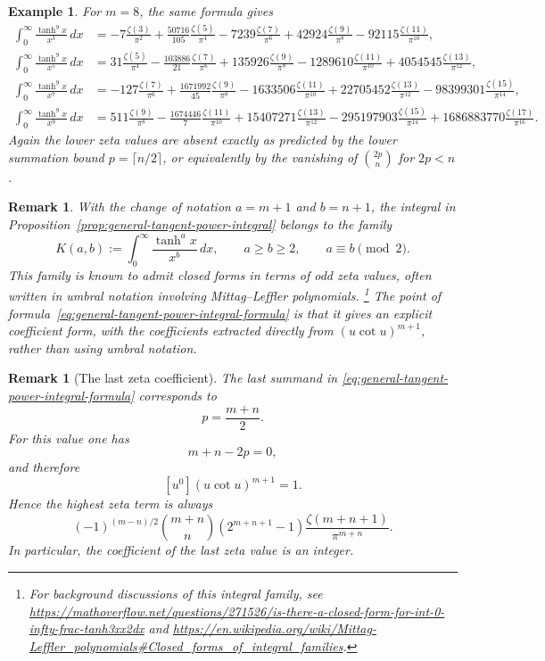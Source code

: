 \documentclass[11pt,twoside]{article}
\newtheorem{remark}[theorem]{Remark}
\newtheorem{example}[theorem]{Example}
\numberwithin{equation}{section}
\begin{document}
\begin{example}
For \(m=8\), the same formula gives
\begin{align*}
\int_0^\infty \frac{\tanh^9 x}{x^3}\,dx
&=
-7\frac{\zeta(3)}{\pi^2}
+\frac{50716}{105}\frac{\zeta(5)}{\pi^4}
-7239\frac{\zeta(7)}{\pi^6}
+42924\frac{\zeta(9)}{\pi^8}
-92115\frac{\zeta(11)}{\pi^{10}},
\\
\int_0^\infty \frac{\tanh^9 x}{x^5}\,dx
&=
31\frac{\zeta(5)}{\pi^4}
-\frac{103886}{21}\frac{\zeta(7)}{\pi^6}
+135926\frac{\zeta(9)}{\pi^8}
-1289610\frac{\zeta(11)}{\pi^{10}}
+4054545\frac{\zeta(13)}{\pi^{12}},
\\
\int_0^\infty \frac{\tanh^9 x}{x^7}\,dx
&=
-127\frac{\zeta(7)}{\pi^6}
+\frac{1671992}{45}\frac{\zeta(9)}{\pi^8}
-1633506\frac{\zeta(11)}{\pi^{10}}
+22705452\frac{\zeta(13)}{\pi^{12}}
-98399301\frac{\zeta(15)}{\pi^{14}},
\\
\int_0^\infty \frac{\tanh^9 x}{x^9}\,dx
&=
511\frac{\zeta(9)}{\pi^8}
-\frac{1674446}{7}\frac{\zeta(11)}{\pi^{10}}
+15407271\frac{\zeta(13)}{\pi^{12}}
-295197903\frac{\zeta(15)}{\pi^{14}}
+1686883770\frac{\zeta(17)}{\pi^{16}}.
\end{align*}
Again the lower zeta values are absent exactly as predicted by the lower
summation bound \(p=\lceil n/2\rceil\), or equivalently by the vanishing
of \(\displaystyle\binom{2p}{n}\) for \(2p<n\).
\end{example}

\begin{remark}
With the change of notation \(a=m+1\) and \(b=n+1\), the integral in
Proposition~\ref{prop:general-tangent-power-integral} belongs to the family
\[
K(a,b):=\int_0^\infty \frac{\tanh^a x}{x^b}\,dx,
\qquad a\geq b\geq 2,\qquad a\equiv b \pmod 2.
\]
This family is known to admit closed forms in terms of odd zeta values, often
written in umbral notation involving Mittag--Leffler polynomials.%
\footnote{For background discussions of this integral family, see
\url{https://mathoverflow.net/questions/271526/is-there-a-closed-form-for-int-0-infty-frac-tanh3xx2dx}
and \url{https://en.wikipedia.org/wiki/Mittag-Leffler_polynomials\#Closed_forms_of_integral_families}.}
The point of formula~\eqref{eq:general-tangent-power-integral-formula} is that it
gives an explicit coefficient form, with the coefficients extracted directly from
\((u\cot u)^{m+1}\), rather than using umbral notation.
\end{remark}

\begin{remark}[The last zeta coefficient]
The last summand in
\eqref{eq:general-tangent-power-integral-formula} corresponds to
\[
p=\frac{m+n}{2}.
\]
For this value one has
\[
m+n-2p=0,
\]
and therefore
\[
[u^0](u\cot u)^{m+1}=1.
\]
Hence the highest zeta term is always
\[
(-1)^{(m-n)/2}
\binom{m+n}{n}
(2^{m+n+1}-1)
\frac{\zeta(m+n+1)}{\pi^{m+n}}.
\]
In particular, the coefficient of the last zeta value is an integer.
\end{remark}
\end{document}
